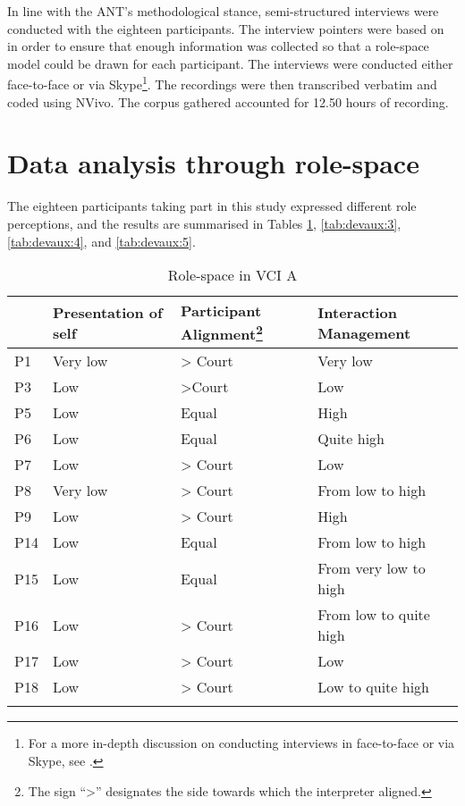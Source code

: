 \documentclass[output=paper]{langsci/langscibook}
\begin{document}
In line with the \textsc{ANT}’s methodological stance, semi-structured interviews were conducted with the eighteen participants. The interview pointers were based on  in order to ensure that enough information was collected so that a role-space model could be drawn for each participant. The interviews were conducted either face-to-face or via Skype\footnote{For a more in-depth discussion on conducting interviews in face-to-face or via Skype, see \citet{Devaux2017b}.}. The recordings were then transcribed verbatim and coded using NVivo. The corpus gathered accounted for 12.50 hours of recording. 

\section{Data analysis through role-space}

The eighteen participants taking part in this study expressed different role perceptions, and the results are summarised in Tables \ref{tab:devaux:2}, \ref{tab:devaux:3}, \ref{tab:devaux:4}, and \ref{tab:devaux:5}.

\begin{table}
\begin{tabular}{llll}
\lsptoprule
   & {Presentation of self} & Participant Alignment\footnote{The sign “>” designates the side towards which the interpreter aligned.} & {Interaction Management}\\\midrule
P1 & Very low & > Court & Very low\\
P3 & Low & >Court & Low\\
P5 & Low & Equal & High\\
P6 & Low & Equal & Quite high \\
P7 & Low & > Court & Low\\
P8 & Very low & > Court & From low to high\\
P9 & Low & > Court & High\\
P14 & Low & Equal & From low to high\\
P15 & Low & Equal & From very low to high\\
P16 & Low & > Court & From low to quite high\\
P17 & Low & > Court & Low\\
P18 & Low & > Court & Low to quite high\\
\lspbottomrule
\end{tabular}
\caption{Role-space in \textsc{VCI} A\label{tab:devaux:2}}
\end{table}
\end{document}
